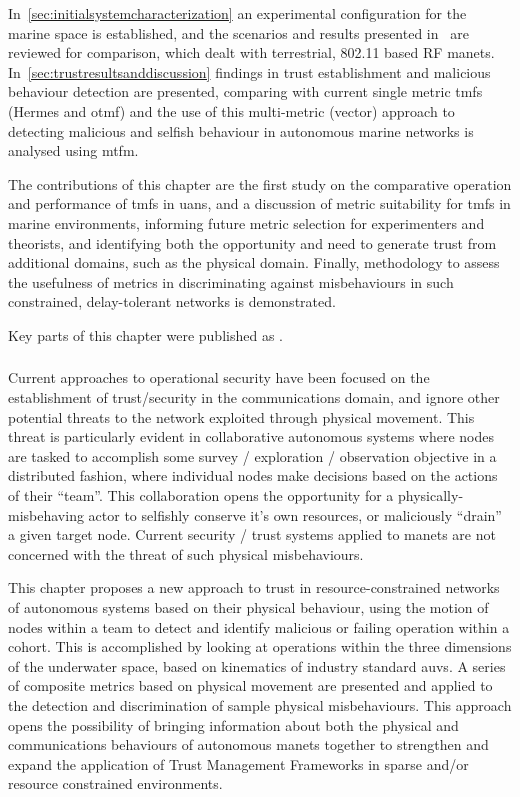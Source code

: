 In~\autoref{sec:initialsystemcharacterization} an experimental configuration for the marine space is established, and the scenarios and results presented in~\citet{Guo11} are reviewed for comparison, which dealt with terrestrial, 802.11 based RF \glspl{manet}.
In~\autoref{sec:trustresultsanddiscussion} findings in trust establishment and malicious behaviour detection are presented, comparing with current single metric \glspl{tmf} (Hermes and \gls{otmf}) and the use of this multi-metric (vector) approach to detecting malicious and selfish behaviour in autonomous marine networks is analysed using \gls{mtfm}.

The contributions of this chapter are the first study on the comparative operation and performance of \glspl{tmf} in \glspl{uan}, and a discussion of metric suitability for \glspl{tmf} in marine environments, informing future metric selection for experimenters and theorists, and identifying both the opportunity and need to generate trust from additional domains, such as the physical domain.
Finally, methodology to assess the usefulness of metrics in discriminating against misbehaviours in such constrained, delay-tolerant networks is demonstrated.

Key parts of this chapter were published as .

\subsubsection{}

Current approaches to operational security have been focused on the establishment of trust/security in the communications domain, and ignore other potential threats to the network exploited through physical movement.
This threat is particularly evident in collaborative autonomous systems where nodes are tasked to accomplish some survey / exploration / observation objective in a distributed fashion, where individual nodes make decisions based on the actions of their ``team''. 
This collaboration opens the opportunity for a physically-misbehaving actor to selfishly conserve it's own resources, or maliciously ``drain'' a given target node.
Current security / trust systems applied to \glspl{manet} are not concerned with the threat of such physical misbehaviours.

This chapter proposes a new approach to trust in resource-constrained networks of autonomous systems based on their physical behaviour, using the motion of nodes within a team to detect and identify malicious or failing operation within a cohort.
This is accomplished by looking at operations within the three dimensions of the underwater space, based on kinematics of industry standard \glspl{auv}.
A series of composite metrics based on physical movement are presented and applied to the detection and discrimination of sample physical misbehaviours.
This approach opens the possibility of bringing information about both the physical and communications behaviours of autonomous \glspl{manet} together to strengthen and expand the application of Trust Management Frameworks in sparse and/or resource constrained environments.

